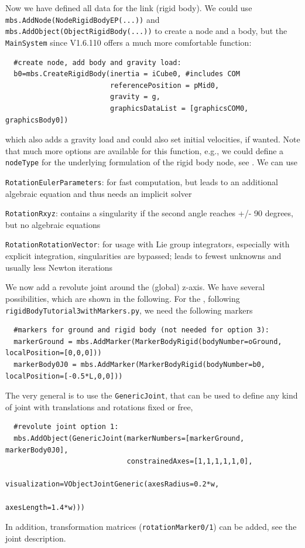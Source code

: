 \noindent Now we have defined all data for the link (rigid body). We could use \texttt{mbs.AddNode(NodeRigidBodyEP(...))} and \texttt{mbs.AddObject(ObjectRigidBody(...))} to create a node and a body, but the \texttt{MainSystem} since V1.6.110 offers a much more comfortable function:
\pythonstyle\begin{lstlisting}
  #create node, add body and gravity load:
  b0=mbs.CreateRigidBody(inertia = iCube0, #includes COM
                         referencePosition = pMid0,
                         gravity = g,
                         graphicsDataList = [graphicsCOM0, graphicsBody0])
\end{lstlisting}
which also adds a gravity load and could also set initial velocities, if wanted. Note that much more options are available for this function, e.g.,
we could define a \texttt{nodeType} for the underlying formulation of the rigid body node, see .
We can use 
\bi
\item \texttt{RotationEulerParameters}: for fast computation, but leads to an additional algebraic equation and thus needs an implicit solver
\item \texttt{RotationRxyz}: contains a singularity if the second angle reaches +/- 90 degrees, but no algebraic equations
\item \texttt{RotationRotationVector}: for usage with Lie group integrators, especially with explicit integration, singularities are bypassed; leads to fewest unknowns and usually less Newton iterations
\ei

\noindent We now add a revolute joint around the (global) z-axis. 
We have several possibilities, which are shown in the following.
For the , following \texttt{rigidBodyTutorial3withMarkers.py}, we need the following markers
\pythonstyle\begin{lstlisting}
  #markers for ground and rigid body (not needed for option 3):
  markerGround = mbs.AddMarker(MarkerBodyRigid(bodyNumber=oGround, localPosition=[0,0,0]))
  markerBody0J0 = mbs.AddMarker(MarkerBodyRigid(bodyNumber=b0, localPosition=[-0.5*L,0,0]))
\end{lstlisting}

\noindent The very general  is to use the \texttt{GenericJoint}, that can be used to define any kind of joint with translations and rotations fixed or free,
\pythonstyle\begin{lstlisting}
  #revolute joint option 1:
  mbs.AddObject(GenericJoint(markerNumbers=[markerGround, markerBody0J0], 
                             constrainedAxes=[1,1,1,1,1,0],
                             visualization=VObjectJointGeneric(axesRadius=0.2*w, 
                                                               axesLength=1.4*w)))
\end{lstlisting}
In addition, transformation matrices (\texttt{rotationMarker0/1}) can be added, see the joint description.

